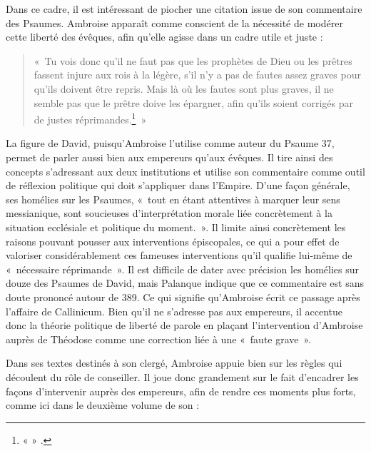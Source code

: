 \bigskip

Dans ce cadre, il est intéressant de piocher une citation issue de son commentaire des Psaumes. Ambroise apparaît comme conscient de la nécessité de modérer cette liberté des évêques, afin qu'elle agisse dans un cadre utile et juste :

\bigskip

\begin{quote}
    «~Tu vois donc qu'il ne faut pas que les prophètes de Dieu ou les prêtres fassent injure aux rois à la légère, s'il n'y a pas de fautes assez graves pour qu'ils doivent être repris. Mais là où les fautes sont plus graves, il ne semble pas que le prêtre doive les épargner, afin qu'ils soient corrigés par de justes réprimandes.\footnote{«  » \cite[ 37,43. Page 172]{ambroise_csel_64}.}~»
\end{quote}

\bigskip

La figure de David, puisqu'Ambroise l'utilise comme auteur du Psaume 37, permet de parler aussi bien aux empereurs qu'aux évêques. Il tire ainsi des concepts s'adressant aux deux institutions et utilise son commentaire comme outil de réflexion politique qui doit s'appliquer dans l'Empire. D'une façon générale, ses homélies sur les Psaumes, «~tout en étant attentives à marquer leur sens messianique, sont soucieuses d'interprétation morale liée concrètement à la situation ecclésiale et politique du moment.\autocite[223]{quasten_initiation}~». Il limite ainsi concrètement les raisons pouvant pousser aux interventions épiscopales, ce qui a pour effet de valoriser considérablement ces fameuses interventions qu'il qualifie lui-même de «~nécessaire réprimande~». Il est difficile de dater avec précision les homélies sur douze des Psaumes de David, mais Palanque indique que ce commentaire est sans doute prononcé autour de 389. Ce qui signifie qu'Ambroise écrit ce passage après l'affaire de Callinicum. Bien qu'il ne s'adresse pas aux empereurs, il accentue donc la théorie politique de liberté de parole en plaçant l'intervention d'Ambroise auprès de Théodose comme une correction liée à une «~faute grave~».

\bigskip

Dans ses textes destinés à son clergé, Ambroise appuie bien sur les règles qui découlent du rôle de conseiller. Il joue donc grandement sur le fait d'encadrer les façons d'intervenir auprès des empereurs, afin de rendre ces moments plus forts, comme ici dans le deuxième volume de son  :

